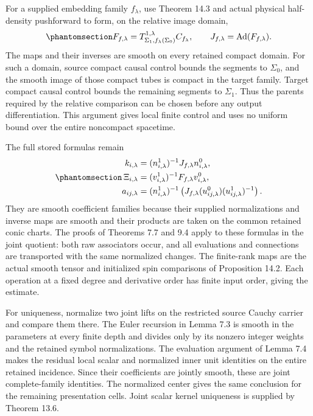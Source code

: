 \documentclass[
  english,
  11pt,
  reqno]{amsart}
\begin{document}
For a supplied embedding family \(f_\lambda\), use Theorem 14.3 and
actual physical half-density pushforward to form, on the relative image
domain,
\begin{equation}\protect\phantomsection\label{eq:family-native-embedding-comparison}{
F_{f,\lambda}
=T^{1,\lambda}_{\Sigma_1,f_\lambda(\Sigma_0)}C_{f_\lambda},
\qquad
J_{f,\lambda}=\operatorname{Ad}(F_{f,\lambda}).
}\end{equation} The maps and their inverses are smooth on every retained
compact domain. For such a domain, source compact causal control bounds
the segments to \(\Sigma_0\), and the smooth image of those compact
tubes is compact in the target family. Target compact causal control
bounds the remaining segments to \(\Sigma_1\). Thus the parents required
by the relative comparison can be chosen before any output
differentiation. This argument gives local finite control and uses no
uniform bound over the entire noncompact spacetime.

The full stored formulas remain
\begin{equation}\protect\phantomsection\label{eq:family-stored-full-comparison}{
\begin{aligned}
k_{i,\lambda}
 &=(n_{i,\lambda}^1)^{-1}J_{f,\lambda}n_{i,\lambda}^0,\\
\Xi_{i,\lambda}
 &=(v_{i,\lambda}^1)^{-1}F_{f,\lambda}v_{i,\lambda}^0,\\
a_{ij,\lambda}
 &=(n_{i,\lambda}^1)^{-1}
 \left(J_{f,\lambda}(u_{ij,\lambda}^0)
       (u_{ij,\lambda}^1)^{-1}\right).
\end{aligned}
}\end{equation} They are smooth coefficient families because their
supplied normalizations and inverse maps are smooth and their products
are taken on the common retained conic charts. The proofs of Theorems
7.7 and 9.4 apply to these formulas in the joint quotient: both raw
associators occur, and all evaluations and connections are transported
with the same normalized changes. The finite-rank maps are the actual
smooth tensor and initialized spin comparisons of Proposition 14.2. Each
operation at a fixed degree and derivative order has finite input order,
giving the estimate.

For uniqueness, normalize two joint lifts on the restricted source
Cauchy carrier and compare them there. The Euler recursion in Lemma 7.3
is smooth in the parameters at every finite depth and divides only by
its nonzero integer weights and the retained symbol normalizations. The
evaluation argument of Lemma 7.4 makes the residual local scalar and
normalized inner unit identities on the entire retained incidence. Since
their coefficients are jointly smooth, these are joint complete-family
identities. The normalized center gives the same conclusion for the
remaining presentation cells. Joint scalar kernel uniqueness is supplied
by Theorem 13.6.
\end{document}
